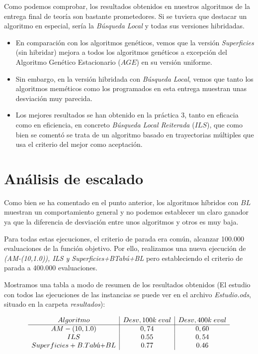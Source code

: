 Como podemos comprobar, los resultados obtenidos en nuestros algoritmos de la entrega final  de teoría son bastante prometedores. Si se tuviera que destacar un algoritmo en especial, sería la \textit{Búsqueda Local} y todas sus versiones hibridadas.


\begin{itemize}
	\item En comparación con los algoritmos genéticos, vemos que la versión \textit{Superficies} (sin hibridar) mejora a todos los algoritmos genéticos a excepción del Algoritmo Genético Estacionario ($AGE$) en su versión uniforme.
	
	\item Sin embargo, en la versión hibridada con \textit{Búsqueda Local}, vemos que tanto los algoritmos meméticos como los programados en esta entrega muestran unas desviación muy parecida.
	
	\item Los mejores resultados se han obtenido en la práctica 3, tanto en eficacia como en eficiencia, en concreto \textit{Búsqueda Local Reiterada} ($ILS$), que como bien se comentó se trata de un algoritmo basado en trayectorias múltiples que usa el criterio del mejor como aceptación.
\end{itemize}

\newpage 
\section{Análisis de escalado}

Como bien se ha comentado en el punto anterior, los algoritmos híbridos con $BL$ muestran un comportamiento general y no podemos establecer un claro ganador ya que la diferencia de desviación entre unos algoritmos y otros es  muy baja.

Para todas estas ejecuciones, el criterio de parada era común, alcanzar 100.000 evaluaciones de la función objetivo. Por ello, realizamos una nueva ejecución de \textit{(AM-(10,1.0)), ILS y Superficies+BTabú+BL} pero estableciendo el criterio de parada a 400.000 evaluaciones.

Mostramos una tabla a modo de resumen de los resultados obtenidos (El estudio con todos las ejecuciones de las instancias se puede ver en el archivo \textit{Estudio.ods}, situado en la carpeta \textit{resultados}):




\[
\begin{array}{c|c|c}{Algoritmo}&Desv, 100k \hspace{0.1cm} eval & Desv, 400k \hspace{0.1cm} eval\\\hline

{}AM-(10,1.0)&0,74&0,60\\

{}ILS&0.55&0,54\\

{}Superficies+B.Tab$\'u$ + BL&0.77&0.46


\end{array}
\label{escalado}
\]




